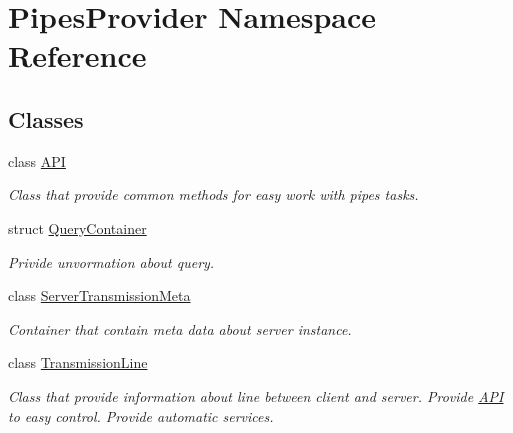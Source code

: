 \hypertarget{namespace_pipes_provider}{}\section{Pipes\+Provider Namespace Reference}
\label{namespace_pipes_provider}
\subsection*{Classes}
\begin{DoxyCompactItemize}
\item 
class \mbox{\hyperlink{class_pipes_provider_1_1_a_p_i}{A\+PI}}
\begin{DoxyCompactList}\small\item\em Class that provide common methods for easy work with pipes\textquotesingle{} tasks. \end{DoxyCompactList}\item 
struct \mbox{\hyperlink{struct_pipes_provider_1_1_query_container}{Query\+Container}}
\begin{DoxyCompactList}\small\item\em Privide unvormation about query. \end{DoxyCompactList}\item 
class \mbox{\hyperlink{class_pipes_provider_1_1_server_transmission_meta}{Server\+Transmission\+Meta}}
\begin{DoxyCompactList}\small\item\em Container that contain meta data about server instance. \end{DoxyCompactList}\item 
class \mbox{\hyperlink{class_pipes_provider_1_1_transmission_line}{Transmission\+Line}}
\begin{DoxyCompactList}\small\item\em Class that provide information about line between client and server. Provide \mbox{\hyperlink{class_pipes_provider_1_1_a_p_i}{A\+PI}} to easy control. Provide automatic services. \end{DoxyCompactList}\end{DoxyCompactItemize}
